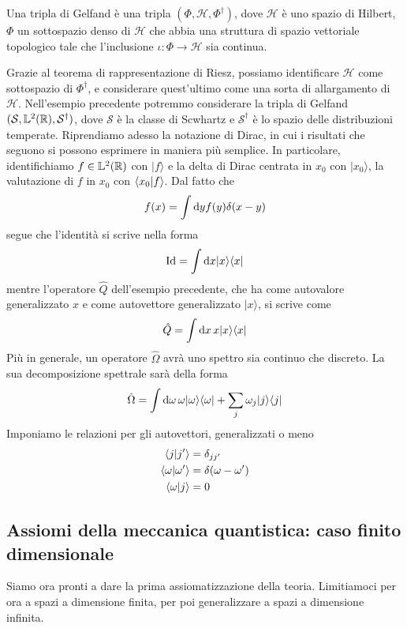\documentclass[a4paper, 11pt]{article}
\renewcommand{\H}{\mathcal{H}}
\newcommand{\id}{\mathrm{Id}}
\renewcommand{\L}{\mathbb{L}}
\newcommand{\pos}{\hat{Q}}
\renewcommand{\ket}[1]{| #1\rangle}
\renewcommand{\bra}[1]{\langle #1|}
\begin{document}
\begin{definition}
	Una tripla di Gelfand è una tripla $(\Phi,\H,\Phi^\dagger)$, dove $\H$ è uno spazio di Hilbert, $\Phi$ un sottospazio denso di $\H$ che abbia una struttura di spazio vettoriale topologico tale che l'inclusione $\iota\colon\Phi\to\H$ sia continua. 
\end{definition}
Grazie al teorema di rappresentazione di Riesz, possiamo identificare $\H$ come sottospazio di $\Phi^\dagger$, e considerare quest'ultimo come una sorta di allargamento di $\H$. Nell'esempio precedente potremmo considerare la tripla di Gelfand $(\mathcal{S},\L^2(\R),\mathcal{S}^\dagger)$, dove $\mathcal{S}$ è la classe di Scwhartz e $\mathcal{S}^\dagger$ è lo spazio delle distribuzioni temperate. Riprendiamo adesso la notazione di Dirac, in cui i risultati che seguono si possono esprimere in maniera più semplice. In particolare, identifichiamo $f\in\L^2(\R)$ con $\ket{f}$ e la delta di Dirac centrata in $x_0$ con $\ket{x_0}$, la valutazione di $f$ in $x_0$ con $\langle x_0\vert f\rangle$. Dal fatto che
\[f(x)=\int \mathrm{d} y f(y)\delta(x-y)\]
segue che l'identità si scrive nella forma
\[\id=\int \d x\ket{x}\bra{x} \]
mentre l'operatore $\pos$ dell'esempio precedente, che ha come autovalore generalizzato $x$ e come autovettore generalizzato $\ket{x}$, si scrive come
\[\pos=\int \d x\, x\ket{x}\bra{x}\]
Più in generale, un operatore $\hat{\Omega}$ avrà uno spettro sia continuo che discreto. La sua decomposizione spettrale sarà della forma
\[\hat{\Omega}=\int\d \omega\,\omega\ket{\omega}\bra{\omega}+\sum_{j}\omega_j\ket{j}\bra{j}\]
Imponiamo le relazioni per gli autovettori, generalizzati o meno
\begin{align*}
	\langle j\vert j'\rangle&=\delta_{jj'}\\\langle \omega\vert\omega'\rangle&=\delta(\omega-\omega')\\\langle \omega\vert j\rangle&=0
\end{align*}
\subsection{Assiomi della meccanica quantistica: caso finito dimensionale}
Siamo ora pronti a dare la prima assiomatizzazione della teoria. Limitiamoci per ora a spazi a dimensione finita, per poi generalizzare a spazi a dimensione infinita. 
\end{document}
